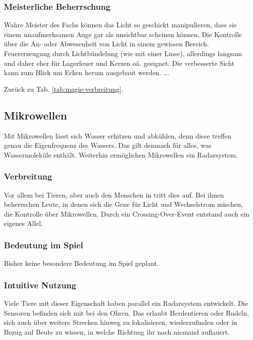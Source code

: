 \subsubsection{Meisterliche Beherrschung} 
\begin{outline}
	\1 Wahre Meister des Fachs können das Licht so geschickt manipulieren, dass sie einem unaufmerksamen Auge gar als unsichtbar scheinen können.
	\1 Die Kontrolle über die An- oder Abwesenheit von Licht in einem gewissen Bereich.
	\1 Feuererzeugung durch Lichtbündelung (wie mit einer Linse), allerdings langsam und daher eher für Lagerfeuer und Kerzen oä. geeignet.
	\1 Die verbesserte Sicht kann zum Blick um Ecken herum ausgebaut werden.
	\1 ...
\end{outline}
Zurück zu Tab. \ref{tab:magie-verbreitung}.



\subsection{Mikrowellen}\label{magie:mikrowelle}
Mit Mikrowellen lässt sich Wasser erhitzen und abkühlen, denn diese treffen genau die Eigenfrequenz des Wassers.
Das gilt demnach für alles, was Wassermoleküle enthält.
Weiterhin ermöglichen Mikrowellen ein Radarsystem.

\subsubsection{Verbreitung}
Vor allem bei Tieren, aber auch den Menschen in  tritt dies auf.
Bei ihnen beherrschen Leute, in denen sich die Gene für Licht und Wechselstrom mischen, die Kontrolle über Mikrowellen.
Durch ein Crossing-Over-Event entstand auch ein eigenes Allel.

\subsubsection{Bedeutung im Spiel}
Bisher keine besondere Bedeutung im Spiel geplant.

\subsubsection{Intuitive Nutzung}
Viele Tiere mit dieser Eigenschaft haben parallel ein Radarsystem entwickelt.
Die Sensoren befinden sich mit bei den Ohren.
Das erlaubt Herdentieren oder Rudeln, sich auch über weitere Strecken hinweg zu lokalisieren, wiederzufinden oder in Bezug auf Beute zu wissen, in welche Richtung ihr noch niemand auflauert.

